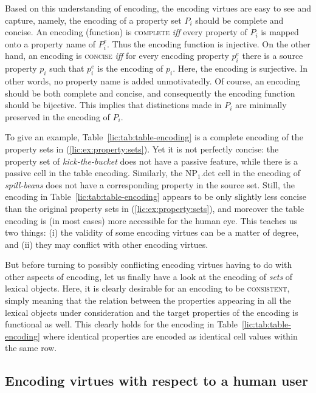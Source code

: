 \documentclass[output=paper]{langsci/langscibook}
\begin{document}
Based on this understanding of encoding, the encoding virtues are easy to see and capture, namely, the encoding of a property set $P_i$ should be complete and concise. An encoding (function) is \textsc{complete} \textit{iff} every property of $P_i$ is mapped onto a property name of $P^e_i$. Thus the encoding function is injective. On the other hand, an encoding is \textsc{concise} \textit{iff} for every encoding property $p^e_i$ there is a source property $p_i$ such that $p^e_i$ is the encoding of $p_i$. Here, the encoding is surjective. In other words, no property name is added unmotivatedly. Of course, an encoding should be both complete and concise, and consequently the encoding function should be bijective. This implies that distinctions made in $P_i$ are minimally preserved in the encoding of $P_i$.

To give an example, Table~\ref{lic:tab:table-encoding} is a complete encoding of the property sets in (\ref{lic:ex:property:sets}). Yet it is not perfectly concise: the property set of \textit{kick-the-bucket} does not have a passive feature, while there is a passive cell in the table encoding. Similarly, the NP$_1$.det cell in the encoding of \textit{spill-beans} does not have a corresponding property in the source set. Still, the encoding in Table~\ref{lic:tab:table-encoding} appears to be only slightly less concise than the original property sets in (\ref{lic:ex:property:sets}), and moreover the table encoding is (in most cases) more accessible for the human eye. This teaches us two things: (i) the validity of some encoding virtues can be a matter of degree, and (ii) they may conflict with other encoding virtues.

But before turning to possibly conflicting encoding virtues having to do with other aspects of encoding, let us finally have a look at the encoding of \textit{sets} of lexical objects. Here, it is clearly desirable for an encoding to be \textsc{consistent}, simply meaning that the relation between the properties appearing in all the lexical objects under consideration and the target properties of the encoding is functional as well. This clearly holds for the encoding in Table~\ref{lic:tab:table-encoding} where identical properties are encoded as identical cell values within the same row.

  
\subsection{Encoding virtues with respect to a human user}
\label{lic:sec:virtues-human}
\end{document}
